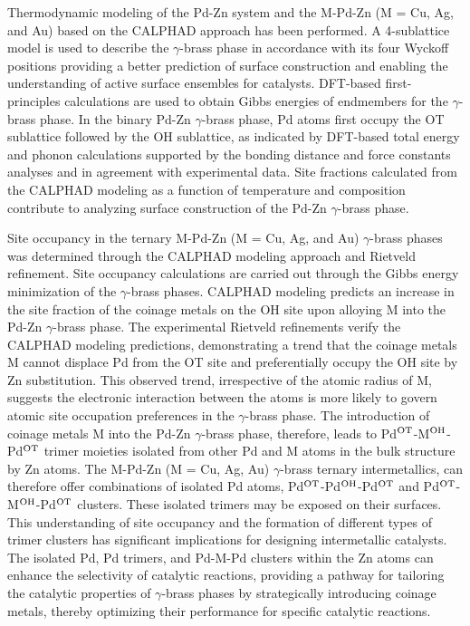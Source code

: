Thermodynamic modeling of the Pd-Zn system and the M-Pd-Zn (M = Cu, Ag, and Au) based on the CALPHAD approach has been performed. A 4-sublattice model is used to describe the $\gamma$-brass phase in accordance with its four Wyckoff positions providing a better prediction of surface construction and enabling the understanding of active surface ensembles for catalysts. DFT-based first-principles calculations are used to obtain Gibbs energies of endmembers for the $\gamma$-brass phase. In the binary Pd-Zn $\gamma$-brass phase, Pd atoms first occupy the OT sublattice followed by the OH sublattice, as indicated by DFT-based total energy and phonon calculations supported by the bonding distance and force constants analyses and in agreement with experimental data. Site fractions calculated from the CALPHAD modeling as a function of temperature and composition contribute to analyzing surface construction of the Pd-Zn $\gamma$-brass phase. 

Site occupancy in the ternary M-Pd-Zn (M = Cu, Ag, and Au) $\gamma$-brass phases was determined through the CALPHAD modeling approach and Rietveld refinement. Site occupancy calculations are carried out through the Gibbs energy minimization of the $\gamma$-brass phases. CALPHAD modeling predicts an increase in the site fraction of the coinage metals on the OH site upon alloying M into the Pd-Zn $\gamma$-brass phase. The experimental Rietveld refinements verify the CALPHAD modeling predictions, demonstrating a trend that the coinage metals M cannot displace Pd from the OT site and preferentially occupy the OH site by Zn substitution. This observed trend, irrespective of the atomic radius of M, suggests the electronic interaction between the atoms is more likely to govern atomic site occupation preferences in the $\gamma$-brass phase. The introduction of coinage metals M into the Pd-Zn $\gamma$-brass phase, therefore, leads to Pd$^{\rm OT}$-M$^{\rm OH}$-Pd$^{\rm OT}$ trimer moieties isolated from other Pd and M atoms in the bulk structure by Zn atoms. The M-Pd-Zn (M = Cu, Ag, Au) $\gamma$-brass ternary intermetallics, can therefore offer combinations of isolated Pd atoms, Pd$^{\rm OT}$-Pd$^{\rm OH}$-Pd$^{\rm OT}$ and Pd$^{\rm OT}$-M$^{\rm OH}$-Pd$^{\rm OT}$ clusters. These isolated trimers may be exposed on their surfaces. This understanding of site occupancy and the formation of different types of trimer clusters has significant implications for designing intermetallic catalysts. The isolated Pd, Pd trimers, and Pd-M-Pd clusters within the Zn atoms can enhance the selectivity of catalytic reactions, providing a pathway for tailoring the catalytic properties of $\gamma$-brass phases by strategically introducing coinage metals, thereby optimizing their performance for specific catalytic reactions.